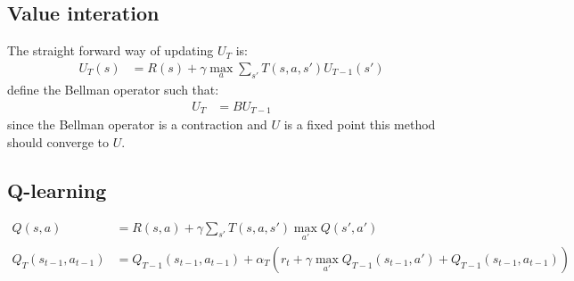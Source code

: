\documentclass{article}
\begin{document}
\subsection*{Value interation}
The straight forward way of updating $U_T$ is:
\begin{align*}
    U_T(s) &= R(s)+\gamma \max_{a} \sum_{s'} T(s,a,s')U_{T-1}(s')
\end{align*}
define the Bellman operator such that:
\begin{align*}
    U_T &= BU_{T-1}
\end{align*}
since the Bellman operator is a contraction and $U$ is a fixed point this method should converge 
to $U$. 
\subsection*{Q-learning}
\begin{align*}
    Q(s,a) 
    &= R(s,a)+\gamma \sum_{s'}T(s,a,s')\max_{a'}Q(s',a') \\
    Q_T(s_{t-1},a_{t-1}) &= Q_{T-1}(s_{t-1},a_{t-1}) + \alpha_T(r_t + \gamma \max_{a'}Q_{T-1}(s_{t-1},a')+Q_{T-1}(s_{t-1},a_{t-1}))
\end{align*}
\end{document}

